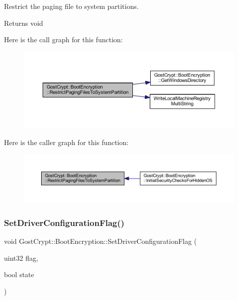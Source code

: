 Restrict the paging file to system partitions. 

\begin{DoxyReturn}{Returns}
void 
\end{DoxyReturn}
Here is the call graph for this function\+:
\nopagebreak
\begin{figure}[H]
\begin{center}
\leavevmode
\includegraphics[width=350pt]{class_gost_crypt_1_1_boot_encryption_abb09defd16cb166c11b788d591241571_cgraph}
\end{center}
\end{figure}
Here is the caller graph for this function\+:
\nopagebreak
\begin{figure}[H]
\begin{center}
\leavevmode
\includegraphics[width=350pt]{class_gost_crypt_1_1_boot_encryption_abb09defd16cb166c11b788d591241571_icgraph}
\end{center}
\end{figure}
\mbox{\label{class_gost_crypt_1_1_boot_encryption_a2a42d620e603b2dfe451fd34a361be35}} 
\subsubsection{\texorpdfstring{Set\+Driver\+Configuration\+Flag()}{SetDriverConfigurationFlag()}}
{\footnotesize\ttfamily void Gost\+Crypt\+::\+Boot\+Encryption\+::\+Set\+Driver\+Configuration\+Flag (\begin{DoxyParamCaption}\item[{uint32}]{flag,  }\item[{bool}]{state }\end{DoxyParamCaption})}



